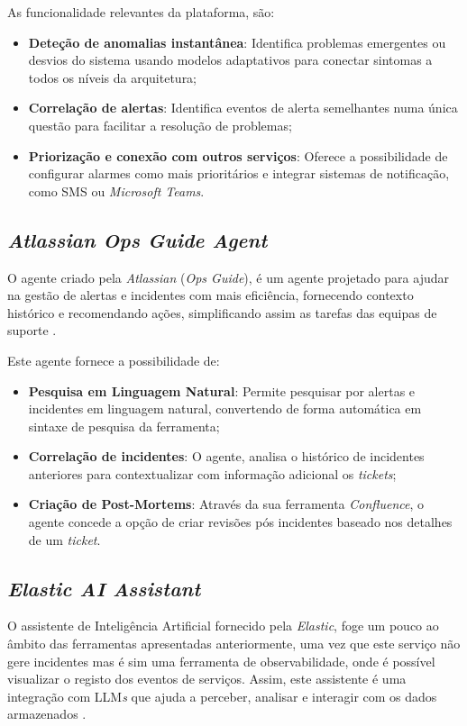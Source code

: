 		As funcionalidade relevantes da plataforma, são:
		\begin{itemize}
			\item \textbf{Deteção de anomalias instantânea}: Identifica problemas emergentes ou desvios do sistema usando modelos adaptativos para conectar sintomas a todos os níveis da arquitetura;
			\item \textbf{Correlação de alertas}: Identifica eventos de alerta semelhantes numa única questão para facilitar a resolução de problemas;
			\item \textbf{Priorização e conexão com outros serviços}: Oferece a possibilidade de configurar alarmes como mais prioritários e integrar sistemas de notificação, como SMS ou \textit{Microsoft Teams}.
		\end{itemize}
	
	\subsection{\textit{Atlassian Ops Guide Agent}}
		O agente criado pela \textit{Atlassian} (\textit{Ops Guide}), é um agente projetado para ajudar na gestão de alertas e incidentes com mais eficiência, fornecendo contexto histórico e recomendando ações, simplificando assim as tarefas das equipas de suporte 	\autocite{WebAtlassian}. 
		
		Este agente fornece a possibilidade de:
		\begin{itemize}
			\item \textbf{Pesquisa em Linguagem Natural}: Permite pesquisar por alertas e incidentes em linguagem natural, convertendo de forma automática em sintaxe de pesquisa da ferramenta;
			\item \textbf{Correlação de incidentes}: O agente, analisa o histórico de incidentes anteriores para contextualizar com informação adicional os \textit{tickets};
			\item \textbf{Criação de Post-Mortems}: Através da sua ferramenta \textit{Confluence}, o agente concede a opção de criar revisões pós incidentes baseado nos detalhes de um \textit{ticket}.
		\end{itemize}
		
	
	\subsection{\textit{Elastic AI Assistant}}
		O assistente de Inteligência Artificial fornecido pela \textit{Elastic}, foge um pouco ao âmbito das ferramentas apresentadas anteriormente, uma vez que este serviço não gere incidentes mas é sim uma ferramenta de observabilidade, onde é possível visualizar o registo dos eventos de serviços. Assim, este assistente é uma integração com \gls{LLM}\textit{s} que ajuda a perceber, analisar e interagir com os dados armazenados \autocite{WebElastic}.
	

